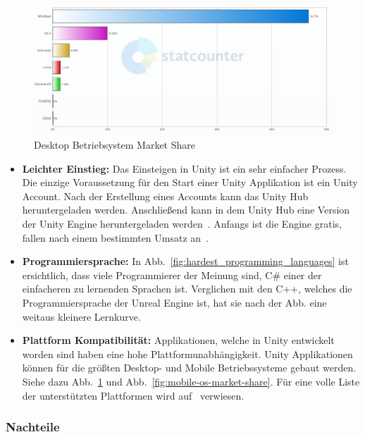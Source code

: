 \begin{figure}
    \centering
    \includegraphics[scale=0.35]{pics/desktop_os_market_share}
    \caption{Desktop Betriebsystem Market Share~\cite{StatCounter_Desktop_2021}}
    \label{fig:desktop-os-market-share}
\end{figure}



\begin{itemize}
    \item \textbf{Leichter Einstieg:} Das Einsteigen in Unity ist ein sehr einfacher Prozess.
    Die einzige Voraussetzung für den Start einer Unity Applikation ist ein Unity Account.
    Nach der Erstellung eines Accounts kann das Unity Hub heruntergeladen werden.
    Anschließend kann in dem Unity Hub eine Version der Unity Engine heruntergeladen werden~\cite{Unity_Download}.
    Anfangs ist die Engine gratis, fallen nach einem bestimmten Umsatz an~\cite{Unity_Pricing_2}.
    \item \textbf{Programmiersprache:} In Abb.~\ref{fig:hardest_programming_languages} ist ersichtlich, dass viele Programmierer der Meinung sind, C\# einer der einfacheren zu lernenden Sprachen ist.
    Verglichen mit den C++, welches die Programmiersprache der Unreal Engine ist, hat sie nach der Abb. eine weitaus kleinere Lernkurve.
    \item \textbf{Plattform Kompatibilität:} Applikationen, welche in Unity entwickelt worden sind haben eine hohe Plattformunabhängigkeit.
    Unity Applikationen können für die größten Desktop- und Mobile Betriebssysteme gebaut werden.
    Siehe dazu Abb.~\ref{fig:desktop-os-market-share} und Abb.~\ref{fig:mobile-os-market-share}.
    Für eine volle Liste der unterstützten Plattformen wird auf~\cite{UNITY_PLATTFORMS} verwiesen.
\end{itemize}

\subsubsection{Nachteile}

